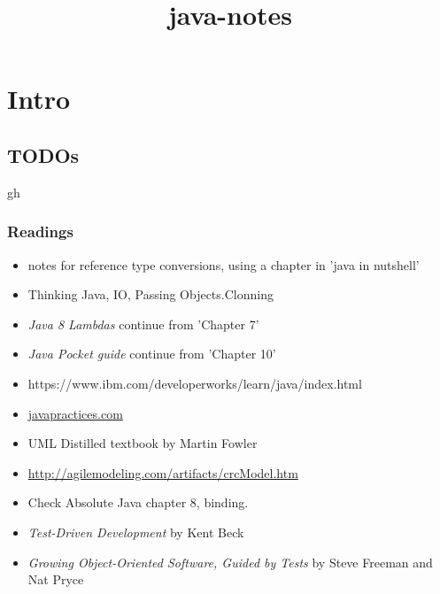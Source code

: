 \documentclass{report}
\title{java-notes}
\begin{document}
\tableofcontents




\part{Intro}



\chapter{TODOs}
gh
\section{Readings}
\begin{itemize}
	\item  notes for reference type conversions, using a chapter in 'java in nutshell'
	\item Thinking Java, IO, Passing Objects.Clonning
	\item \textit{Java 8 Lambdas} continue from 'Chapter 7'
	\item \textit{Java Pocket guide} continue from  'Chapter 10'
	\item https://www.ibm.com/developerworks/learn/java/index.html
  	\item \href{http://www.javapractices.com/home/HomeAction.do;jsessionid=30B15108A7091DF24625AA7794107BE8} 
      {javapractices.com}
      
	\item UML Distilled textbook by Martin Fowler 
	\item \url{http://agilemodeling.com/artifacts/crcModel.htm}
	\item  Check Absolute Java chapter 8, binding.
	\item \textit{Test-Driven Development} by Kent Beck
	\item \textit{Growing Object-Oriented Software, Guided by Tests} by Steve Freeman and Nat Pryce 
\end{itemize}
\end{document}
